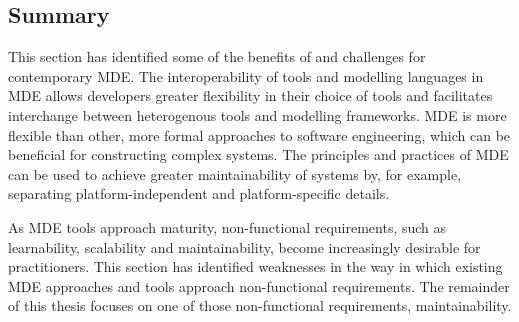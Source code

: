 \subsection{Summary}
This section has identified some of the benefits of and challenges for contemporary MDE. The interoperability of tools and modelling languages in MDE allows developers greater flexibility in their choice of tools and facilitates interchange between heterogenous tools and modelling frameworks. MDE is more flexible than other, more formal approaches to software engineering, which can be beneficial for constructing complex systems. The principles and practices of MDE can be used to achieve greater maintainability of systems by, for example, separating platform-independent and platform-specific details.

As MDE tools approach maturity, non-functional requirements, such as learnability, scalability and maintainability, become increasingly desirable for practitioners. This section has identified weaknesses in the way in which existing MDE approaches and tools approach non-functional requirements. The remainder of this thesis focuses on one of those non-functional requirements, maintainability.